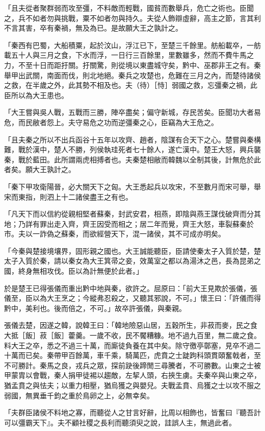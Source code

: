 \begin{pinyinscope}
「且夫從者聚群弱而攻至彊，不料敵而輕戰，國貧而數舉兵，危亡之術也。臣聞之，兵不如者勿與挑戰，粟不如者勿與持久。夫從人飾辯虛辭，高主之節，言其利不言其害，卒有秦禍，無及為已。是故願大王之孰計之。

「秦西有巴蜀，大船積粟，起於汶山，浮江已下，至楚三千餘里。舫船載卒，一舫載五十人與三月之食，下水而浮，一日行三百餘里，里數雖多，然而不費牛馬之力，不至十日而距扜關。扜關驚，則從境以東盡城守矣，黔中、巫郡非王之有。秦舉甲出武關，南面而伐，則北地絕。秦兵之攻楚也，危難在三月之內，而楚待諸侯之救，在半歲之外，此其勢不相及也。夫（待）［恃］弱國之救，忘彊秦之禍，此臣所以為大王患也。

「大王嘗與吳人戰，五戰而三勝，陣卒盡矣；偏守新城，存民苦矣。臣聞功大者易危，而民敝者怨上。夫守易危之功而逆彊秦之心，臣竊為大王危之。

「且夫秦之所以不出兵函谷十五年以攻齊、趙者，陰謀有合天下之心。楚嘗與秦構難，戰於漢中，楚人不勝，列侯執珪死者七十餘人，遂亡漢中。楚王大怒，興兵襲秦，戰於藍田。此所謂兩虎相搏者也。夫秦楚相敝而韓魏以全制其後，計無危於此者矣。願大王孰計之。

「秦下甲攻衛陽晉，必大關天下之匈。大王悉起兵以攻宋，不至數月而宋可舉，舉宋而東指，則泗上十二諸侯盡王之有也。

「凡天下而以信約從親相堅者蘇秦，封武安君，相燕，即陰與燕王謀伐破齊而分其地；乃詳有罪出走入齊，齊王因受而相之；居二年而覺，齊王大怒，車裂蘇秦於市。夫以一詐偽之蘇秦，而欲經營天下，混一諸侯，其不可成亦明矣。

「今秦與楚接境壤界，固形親之國也。大王誠能聽臣，臣請使秦太子入質於楚，楚太子入質於秦，請以秦女為大王箕帚之妾，效萬室之都以為湯沐之邑，長為昆弟之國，終身無相攻伐。臣以為計無便於此者。」

於是楚王已得張儀而重出黔中地與秦，欲許之。屈原曰：「前大王見欺於張儀，張儀至，臣以為大王烹之；今縱弗忍殺之，又聽其邪說，不可。」懷王曰：「許儀而得黔中，美利也。後而倍之，不可。」故卒許張儀，與秦親。

張儀去楚，因遂之韓，說韓王曰：「韓地險惡山居，五穀所生，非菽而麥，民之食大抵［飯］菽［飯］藿羹。一歲不收，民不饜糟糠。地不過九百里，無二歲之食。料大王之卒，悉之不過三十萬，而廝徒負養在其中矣。除守徼亭鄣塞，見卒不過二十萬而已矣。秦帶甲百餘萬，車千乘，騎萬匹，虎賁之士跿跔科頭貫頤奮戟者，至不可勝計。秦馬之良，戎兵之眾，探前趹後蹄閒三尋騰者，不可勝數。山東之士被甲蒙胄以會戰，秦人捐甲徒裼以趨敵，左挈人頭，右挾生虜。夫秦卒與山東之卒，猶孟賁之與怯夫；以重力相壓，猶烏獲之與嬰兒。夫戰孟賁、烏獲之士以攻不服之弱國，無異垂千鈞之重於鳥卵之上，必無幸矣。

「夫群臣諸侯不料地之寡，而聽從人之甘言好辭，比周以相飾也，皆奮曰『聽吾計可以彊霸天下』。夫不顧社稷之長利而聽須臾之說，詿誤人主，無過此者。


\end{pinyinscope}
